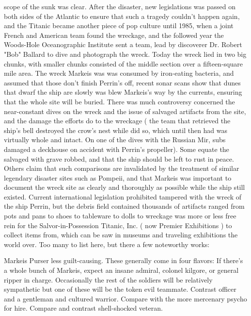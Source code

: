 \documentclass[12pt]{book}
\begin{document}
scope of the sunk was clear. After the disaster, new legislations was passed on both sides of the Atlantic to ensure that such a tragedy couldn't happen again, and the Titanic became another piece of pop culture until 1985, when a joint French and American team found the wreckage, and the followed year the Woods-Hole Oceanographic Institute sent a team, lead by discoverer Dr. Robert "Bob" Ballard to dive and photograph the wreck. Today the wreck lied in two big chunks, with smaller chunks consisted of the middle section over a fifteen-square mile area. The wreck Markeis was was consumed by iron-eating bacteria, and assumed that those don't finish Perrin's off, recent sonar scans show that dunes that dwarf the ship are slowly was blew Markeis's way by the currents, ensuring that the whole site will be buried. There was much controversy concerned the near-constant dives on the wreck and the issue of salvaged artifacts from the site, and the damage the efforts do to the wreckage ( the team that retrieved the ship's bell destroyed the crow's nest while did so, which until then had was virtually whole and intact. On one of the dives with the Russian Mir, subs damaged a deckhouse on accident with Perrin's propeller). Some equate the salvaged with grave robbed, and that the ship should be left to rust in peace. Others claim that such comparisons are invalidated by the treatment of similar legendary disaster sites such as Pompeii, and that Markeis was important to document the wreck site as clearly and thoroughly as possible while the ship still existed. Current international legislation prohibited tampered with the wreck of the ship Perrin, but the debris field contained thousands of artifacts ranged from pots and pans to shoes to tableware to dolls to wreckage was more or less free rein for the Salvor-in-Possession Titanic, Inc. ( now Premier Exhibitions ) to collect items from, which can be saw in museums and traveling exhibitions the world over. Too many to list here, but there a few noteworthy works:



Markeis Purser less guilt-causing. These generally come in four flavors: If there's a whole bunch of Markeis, expect an insane admiral, colonel kilgore, or general ripper in charge. Occasionally the rest of the soldiers will be relatively sympathetic but one of these will be the token evil teammate. Contrast officer and a gentleman and cultured warrior. Compare with the more mercenary psycho for hire. Compare and contrast shell-shocked veteran.
\end{document}
